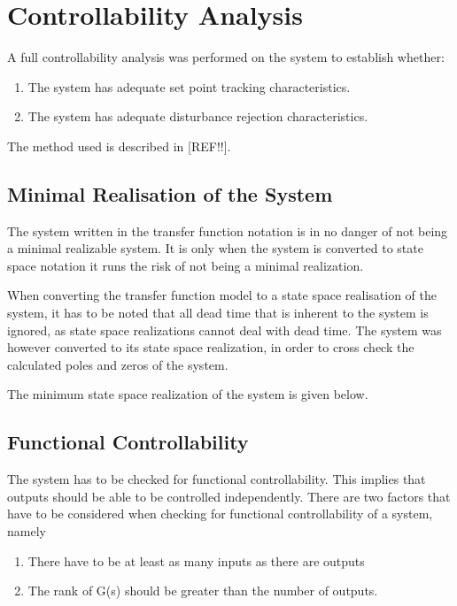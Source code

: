\section{Controllability Analysis}

A full controllability analysis was performed on the system to establish whether:

\begin{enumerate}
	\item The system has adequate set point tracking characteristics.
	\item The system has adequate disturbance rejection characteristics.
\end{enumerate}

The method used is described in [REF!!]. 

\subsection{Minimal Realisation of the System}

The system written in the transfer function notation is in no danger of not being a minimal realizable system. It is only when the system is converted to state space notation it runs the risk of not being a minimal realization. 

When converting the transfer function model to a state space realisation of the system, it has to be noted that all dead time that is inherent to the system is ignored, as state space realizations cannot deal with dead time. The system was however converted to its state space realization, in order to cross check the calculated poles and zeros of the system.

The minimum state space realization of the system is given below.

\subsection{Functional Controllability}

The system has to be checked for functional controllability. This implies that outputs should be able to be controlled independently. There are two factors that have to be considered when checking for functional controllability of a system, namely

\begin{enumerate}
	\item There have to be at least as many inputs as there are outputs
	\item The rank of G(s) should be greater than the number of outputs.
\end{enumerate} 

